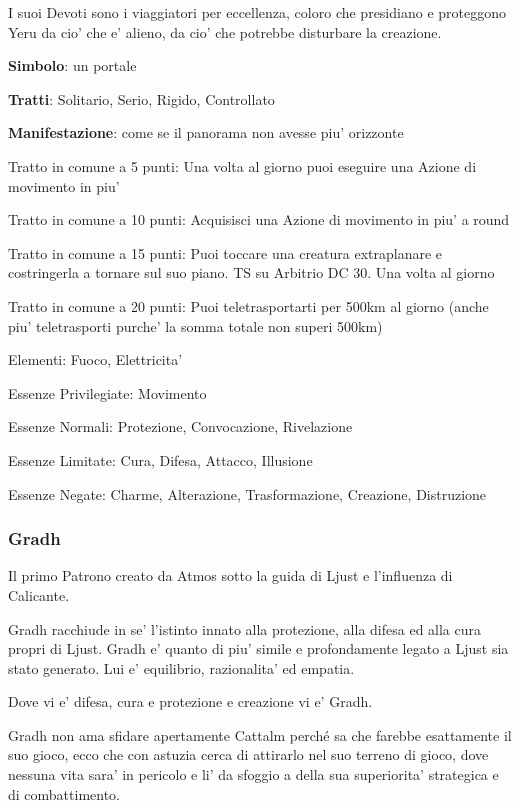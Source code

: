 \documentclass[a4paper,11pt,twoside,openany]{book}
\begin{document}
{I suoi Devoti sono i viaggiatori per eccellenza, coloro che presidiano e proteggono Yeru da cio' che e' alieno, da cio' che potrebbe disturbare la creazione.

\textbf{Simbolo}: un portale

\textbf{Tratti}: Solitario, Serio, Rigido, Controllato

\textbf{Manifestazione}: come se il panorama non avesse piu' orizzonte

\bigskip

Tratto in comune a 5 punti: Una volta al giorno puoi eseguire una Azione di movimento in piu'

Tratto in comune a 10 punti: Acquisisci una Azione di movimento in piu' a round

Tratto in comune a 15 punti: Puoi toccare una creatura extraplanare e costringerla a tornare sul suo piano. TS su Arbitrio DC 30. Una volta al giorno
 
Tratto in comune a 20 punti: Puoi teletrasportarti per 500km al giorno (anche piu' teletrasporti purche' la somma totale non superi 500km)

\bigskip

Elementi: Fuoco, Elettricita'

\bigskip

Essenze Privilegiate: Movimento

Essenze Normali: Protezione, Convocazione, Rivelazione

Essenze Limitate: Cura, Difesa, Attacco, Illusione

Essenze Negate: Charme, Alterazione, Trasformazione, Creazione, Distruzione

\subsubsection{Gradh}

\label{gradh}

Il primo Patrono creato da Atmos sotto la guida di Ljust e l'influenza di Calicante.

Gradh racchiude in se' l'istinto innato alla protezione, alla difesa ed alla cura propri di Ljust. Gradh e' quanto di piu' simile e profondamente legato a Ljust sia stato generato. Lui e' equilibrio, razionalita' ed empatia.

Dove vi e' difesa, cura e protezione e creazione vi e' Gradh.

Gradh non ama sfidare apertamente Cattalm perché sa che farebbe esattamente il suo gioco, ecco che con astuzia cerca di attirarlo nel suo terreno di gioco, dove nessuna vita sara' in pericolo e li' da sfoggio a della sua superiorita' strategica e di combattimento.

}
\end{document}
